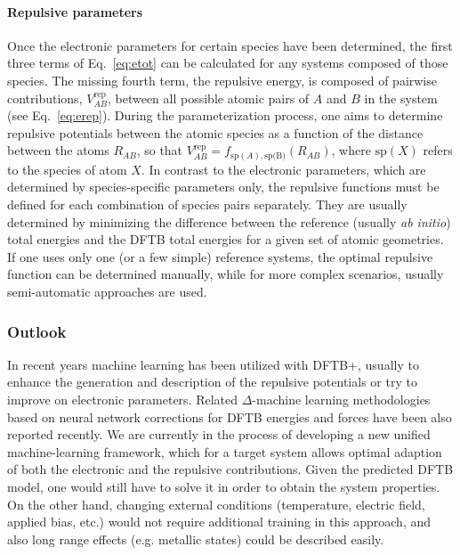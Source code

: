 \documentclass{revtex4-1}
\newcommand{\dftbp}{DFTB+}
\begin{document}
\paragraph{Repulsive parameters} Once the electronic parameters for
  certain species have been determined, the first three terms of
  Eq.~\eqref{eq:etot} can be calculated for any systems composed of those
  species. The missing fourth term, the repulsive energy, is composed of
  pairwise contributions, $V^{\text{rep}}_{AB}$, between all possible atomic
  pairs of $A$ and $B$ in the system (see Eq.~\eqref{eq:erep}). During the
  parameterization process, one aims to determine repulsive potentials between
  the atomic species as a function of the distance between the atoms $R_{AB}$,
  so that $V^{\text{rep}}_{AB} = f_{\text{sp}(A),\text{sp(B)}}(R_{AB})$, where
  $\text{sp}(X)$ refers to the species of atom $X$. In contrast to the
  electronic parameters, which are determined by species-specific parameters
  only, the repulsive functions must be defined for each combination of species
  pairs separately. They are usually determined by minimizing the difference
  between the reference (usually {\it ab initio}) total energies and the DFTB
  total energies for a given set of atomic geometries. If one uses only one (or
  a few simple) reference systems, the optimal repulsive function can be
  determined manually, while for more complex scenarios, usually semi-automatic
  approaches\cite{Gaus2009, Hellstrom2013, Vuong2018, skpar-repo, adpt-repo} are
  used.



\subsubsection{Outlook}

In recent years machine learning has been utilized with \dftbp{}, usually to
enhance the generation and description of the repulsive potentials
\cite{Knaup2007, Kranz2018, Zhu2019, Huran2018, Goldman2018} or try to improve
on electronic parameters.\cite{Li2018, Huran2018} Related $\Delta$-machine
learning\cite{Ramakrishnan2015} methodologies based on neural network
corrections for DFTB energies and forces have been also reported
recently.\cite{Shen2016, Shen2018} We are currently in the process of developing
a new unified machine-learning framework, which for a target system allows
optimal adaption of both the electronic and the repulsive contributions. Given
the predicted DFTB model, one would still have to solve it in order to obtain
the system properties. On the other hand, changing external conditions
(temperature, electric field, applied bias, etc.) would not require additional
training in this approach, and also long range effects (e.g. metallic states)
could be described easily.
\end{document}

